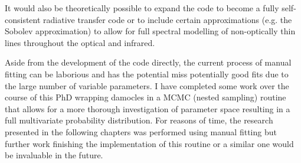 It would also be theoretically possible to expand the code to become a fully self-consistent radiative transfer code or to include certain approximations (e.g. the Sobolev approximation) to allow for full spectral modelling of non-optically thin lines throughout the optical and infrared.

Aside from the development of the code directly, the current process of manual fitting can be laborious and has the potential miss potentially good fits due to the large number of variable parameters.  I have completed some work over the course of this PhD wrapping {\sc damocles} in a MCMC (nested sampling) routine that allows for a more thorough investigation of parameter space resulting in a full multivariate probability distribution.  For reasons of time, the research presented in the following chapters was performed using manual fitting but further work finishing the implementation of this routine or a similar one would be invaluable in the future.





